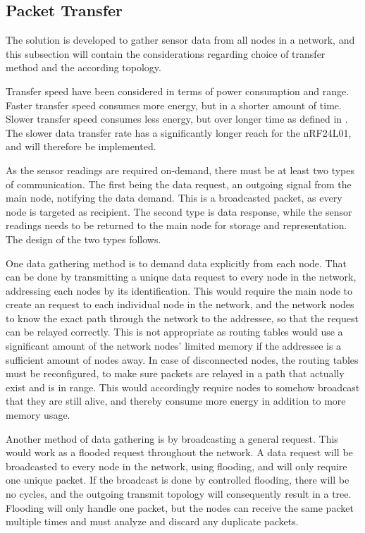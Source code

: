 \subsection{Packet Transfer}
The solution is developed to gather sensor data from all nodes in a network, and this subsection will contain the considerations regarding choice of transfer method and the according topology.

Transfer speed have been considered in terms of power consumption and range. Faster transfer speed consumes more energy, but in a shorter amount of time. Slower transfer speed consumes less energy, but over longer time as defined in \cite{nf24datasheet}. The slower data transfer rate has a significantly longer reach for the nRF24L01, and will therefore be implemented.


As the sensor readings are required on-demand, there must be at least two types of communication. The first being the data request, an outgoing signal from the main node, notifying the data demand. This is a broadcasted packet, as every node is targeted as recipient. The second type is data response, while the sensor readings needs to be returned to the main node for storage and representation. The design of the two types follows.

One data gathering method is to demand data explicitly from each node. That can be done by transmitting a unique data request to every node in the network, addressing each nodes by its identification. This would require the main node to create an request to each individual node in the network, and the network nodes to know the exact path through the network to the addressee, so that the request can be relayed correctly. This is not appropriate as routing tables would use a significant amount of the network nodes' limited memory if the addressee is a sufficient amount of nodes away. In case of disconnected nodes, the routing tables must be reconfigured, to make sure packets are relayed in a path that actually exist and is in range. This would accordingly require nodes to somehow broadcast that they are still alive, and thereby consume more energy in addition to more memory usage.

Another method of data gathering is by broadcasting a general request. This would work as a flooded request throughout the network.
A data request will be broadcasted to every node in the network, using flooding, and will only require one unique packet.
If the broadcast is done by controlled flooding, there will be no cycles, and the outgoing transmit topology will consequently result in a tree. 
Flooding will only handle one packet, but the nodes can receive the same packet multiple times and must analyze and discard any duplicate packets.

